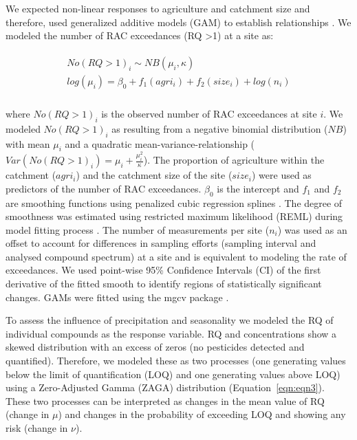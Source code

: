 \documentclass[journal=esthag,manuscript=article]{achemso}
\begin{document}
We expected non-linear responses to agriculture and catchment size and therefore, used generalized additive models (GAM) to establish relationships \citep{fewster_analysis_2000}.
We modeled the number of RAC exceedances (RQ \textgreater 1) at a site as:

\begin{align}
\begin{split}
  No(RQ > 1)_i \sim NB(\mu_i, \kappa) \\
  log(\mu_i)= \beta_0 + f_1(agri_i) + f_2(size_i) + log(n_i) \\
\end{split}
\end{align}

where $No(RQ > 1)_i$ is the observed number of RAC exceedances at site $i$. 
We modeled $No(RQ > 1)_i$ as resulting from a negative binomial distribution ($NB$) with mean $\mu_i$ and a quadratic mean-variance-relationship ($Var(No(RQ > 1)_i) = \mu_i + \frac{\mu_i^2}{\kappa}$).
The proportion of agriculture within the catchment ($agri_i$) and the catchment size of the site ($size_i$) were used as predictors of the number of RAC exceedances. 
$\beta_0$ is the intercept and $f_1$ and $f_2$ are smoothing functions using penalized cubic regression splines \citep{wood_generalized_2006}. 
The degree of smoothness was estimated using restricted maximum likelihood (REML) during model fitting process \citep{wood_fast_2011}.
The number of measurements per site ($n_i$) was used as an offset to account for differences in sampling efforts (sampling interval and analysed compound spectrum) at a site and is equivalent to modeling the rate of exceedances. 
We used point-wise 95\% Confidence Intervals (CI) of the first derivative of the fitted smooth to identify regions of statistically significant changes.
GAMs were fitted using the mgcv package \citep{wood_fast_2011}.

To assess the influence of precipitation and seasonality we modeled the RQ of individual compounds as the response variable.
RQ and concentrations show a skewed distribution with an excess of zeros (no pesticides detected and quantified). 
Therefore, we modeled these as two processes (one generating values below the limit of quantification (LOQ) and one generating values above LOQ) using a Zero-Adjusted Gamma (ZAGA) distribution \cite{rigby_generalized_2005,stasinopoulos_gamlss.dist:_2016} (Equation~\ref{eqn:eqn3}).
These two processes can be interpreted as changes in the mean value of RQ (change in $\mu$) and changes in the probability of exceeding LOQ and showing any risk (change in $\nu$).
\end{document}
